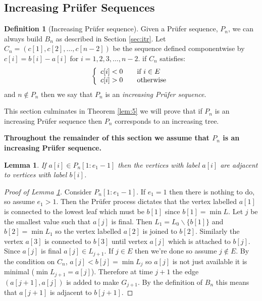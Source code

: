 \documentclass[10pt]{article} %
\newtheorem{lem}[thm]{Lemma}
\theoremstyle{definition}
\newtheorem{defn}[thm]{Definition}
\begin{document}
\subsection{Increasing Pr\"{u}fer Sequences}\label{sec:it}
\begin{defn}[Increasing Pr\"{u}fer sequence]
Given a Pr\"{u}fer sequence, $P_{n}$, we can always build $B_{n}$ as described in Section \ref{sec:itr}.  Let $C_{n} = (c[1],c[2],\dots,c[n-2])$ be the sequence defined componentwise by $c[i] = b[i] - a[i]$ for $i = 1,2,3,\dots,n-2$. if $C_{n}$ satisfies:
\[  \left\{
  \begin{array}{l l}
    c[i] < 0 & \quad \text{if $i \in E$}\\
    c[i] > 0  & \quad \text{otherwise}
  \end{array} \right.\]
and $n \notin P_{n}$ then we say that $P_{n}$ is an \emph{increasing Pr\"{u}fer sequence}.  
\end{defn}

This section culminates in Theorem \ref{lem:5} we will prove that if $P_{n}$ is an increasing Pr\"{u}fer sequence then $P_{n}$ corresponds to an increasing tree. %

{\bfseries Throughout the remainder of this section we assume that $P_{n}$ is an increasing Pr\"{u}fer sequence.}  

\begin{lem}\label{lem:0}
If $a[i] \in P_{n}[1 : e_{1} - 1]$ then the vertices with label $a[i]$ are adjacent to vertices with label $b[i]$.

\end{lem}
   
\begin{proof}[Proof of Lemma \ref{lem:0}]
Consider $P_{n}[1 : e_{1} - 1]$.  If $e_{1} = 1$ then there is nothing to do, so assume $e_{1} >1$. Then the Pr\"{u}fer process dictates that the vertex labelled $a[1]$ is connected to the lowest leaf which must be $b[1]$ since $b[1]  = \min L$.  Let $j$ be the smallest value such that $a[j]$ is final.  Then $L_{1} = L_{0} \backslash \{b[1]\}$ and $b[2] = \min L_{1}$ so the vertex labelled $a[2]$ is joined to $b[2]$.  Similarly the vertex $a[3]$ is connected to $b[3]$ until vertex $a[j]$ which is attached to $b[j]$.  Since $a[j]$ is final $a[j] \in L_{j+1}$.  If $j \in E$ then we're done so assume $j \notin E$. By the condition on $C_{n}$, $a[j]<b[j] = \min L_{j}$ so $a[j]$ is not just available it is minimal ($\min L_{j+1} = a[j]$).  Therefore at time  $j+1$ the edge $(a[j+1],a[j])$ is added to make $G_{j+1}$. By the definition of $B_{n}$ this means that $a[j+1]$ is adjacent to $b[j+1]$.  
\end{proof}
\end{document}
